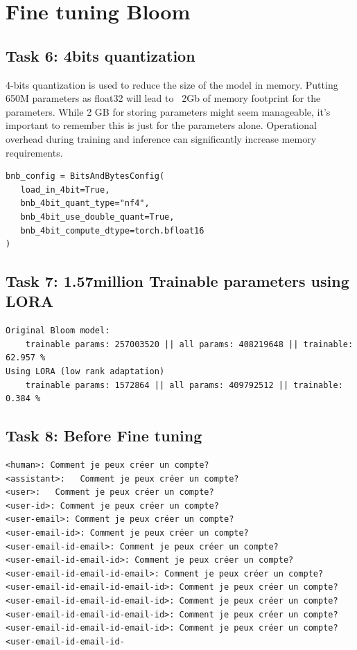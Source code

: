 \documentclass[a4paper]{article}
\begin{document}
\section{Fine tuning Bloom}
\subsection*{Task 6: 4bits quantization}
4-bits quantization is used to reduce the size of the model in memory.
Putting 650M parameters as float32 will lead to ~2Gb of memory footprint for the parameters.
While 2 GB for storing parameters might seem manageable, it's important to remember this is just for the parameters alone.
Operational overhead during training and inference can significantly increase memory requirements.

\begin{verbatim}
bnb_config = BitsAndBytesConfig(
   load_in_4bit=True,
   bnb_4bit_quant_type="nf4",
   bnb_4bit_use_double_quant=True,
   bnb_4bit_compute_dtype=torch.bfloat16
)
\end{verbatim}

\subsection*{Task 7: 1.57million Trainable parameters using LORA}
\begin{verbatim}
Original Bloom model:
    trainable params: 257003520 || all params: 408219648 || trainable: 62.957 %
Using LORA (low rank adaptation)
    trainable params: 1572864 || all params: 409792512 || trainable: 0.384 %
\end{verbatim}



\subsection*{Task 8: Before Fine tuning}
\begin{verbatim}
<human>: Comment je peux créer un compte?  
<assistant>:   Comment je peux créer un compte?  
<user>:   Comment je peux créer un compte?  
<user-id>: Comment je peux créer un compte?  
<user-email>: Comment je peux créer un compte?  
<user-email-id>: Comment je peux créer un compte?  
<user-email-id-email>: Comment je peux créer un compte?  
<user-email-id-email-id>: Comment je peux créer un compte?  
<user-email-id-email-id-email>: Comment je peux créer un compte?  
<user-email-id-email-id-email-id>: Comment je peux créer un compte?  
<user-email-id-email-id-email-id>: Comment je peux créer un compte?  
<user-email-id-email-id-email-id>: Comment je peux créer un compte?  
<user-email-id-email-id-email-id>: Comment je peux créer un compte?  
<user-email-id-email-id-
\end{verbatim}
\end{document}
